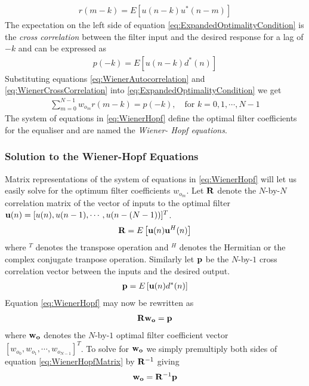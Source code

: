 \begin{align}
	r(m-k) = E\left[u(n-k)u^{*}(n-m)\right]
	\label{eq:WienerAutocorrelation}
\end{align}
The expectation on the left side of equation %
\ref{eq:ExpandedOptimalityCondition} is the %
\emph{cross correlation} between the filter %
input and the desired response for a lag %
of $-k$ and can be expressed as
\begin{align}
	p(-k) = E\left[u(n-k)d^{*}(n)\right]
	\label{eq:WienerCrossCorrelation}
\end{align}
Substituting equations \ref{eq:WienerAutocorrelation} %
and \ref{eq:WienerCrossCorrelation} into %
\ref{eq:ExpandedOptimalityCondition} %
we get
\begin{align}
	\sum_{m=0}^{N-1}w_{o_{m}}r(m-k)=p(-k),\quad
	\text{for }k=0,1,\cdots,N-1
	\label{eq:WienerHopf}
\end{align}
The system of equations in \ref{eq:WienerHopf} %
define the optimal filter coefficients for the %
equaliser and are named the \emph{Wiener-%
Hopf equations}.
\subsubsection{Solution to the Wiener-Hopf Equations}
Matrix representations of the system of equations in %
\ref{eq:WienerHopf} will let us easily solve for %
the optimum filter coefficients $w_{o_{m}}$. %
Let $\bold{R}$ denote the $N$-by-$N$ correlation %
matrix of the vector of inputs to the optimal filter %
$\bold{u}(n) = [u(n),u(n-1),\cdots,u(n-(N-1))]^T$.
\begin{align}
	\bold{R} = E\left[\bold{u}(n)\bold{u}^{H}(n)\right]
\end{align}
where $^{T}$ denotes the transpose operation and %
$^{H}$ denotes the Hermitian or the complex conjugate %
tranpose operation. Similarly let $\bold{p}$ be the %
$N$-by-$1$ cross correlation vector between %
the inputs and the desired output. 
\begin{align}
	\bold{p} = E\left[\bold{u}(n)d^{*}(n)\right]
\end{align}
Equation \ref{eq:WienerHopf} may now be rewritten %
as
\begin{align}
	\bold{R}\bold{w_{o}} = \bold{p}
	\label{eq:WienerHopfMatrix}
\end{align}
where $\bold{w_{o}}$ denotes the $N$-by-$1$ optimal %
filter coefficient vector $[w_{o_{0}},w_{o_{1}},%
\cdots,w_{o_{N-1}}]^T$. To solve for $\bold{w_{o}}$ %
we simply premultiply both sides of equation %
\ref{eq:WienerHopfMatrix} by $\bold{R}^{-1}$ giving
\begin{align}
	\bold{w_{o}} = \bold{R}^{-1}\bold{p}
	\label{eq:WienerHopfSolution}
\end{align}
